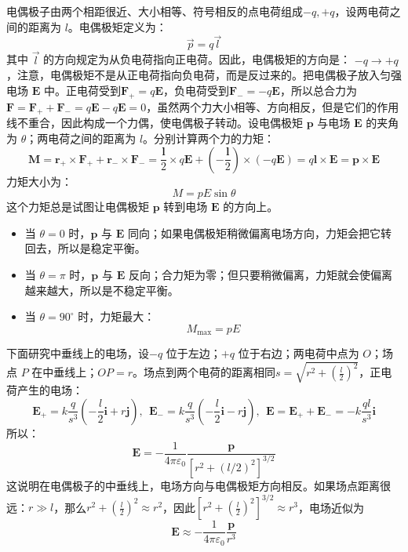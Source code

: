 \documentclass[lang=cn,11pt]{elegantbook}
\begin{document}
\begin{definition}[电偶极子]
  电偶极子由两个相距很近、大小相等、符号相反的点电荷组成\(-q,+q\)，设两电荷之间的距离为 \(l\)。电偶极矩定义为：
\[
\vec{p}=q\overrightarrow{l}
\]其中 \(\overrightarrow{l}\) 的方向规定为从负电荷指向正电荷。因此，电偶极矩的方向是：
\(
-q\longrightarrow +q
\)，注意，电偶极矩不是从正电荷指向负电荷，而是反过来的。把电偶极子放入匀强电场 \(\mathbf E\) 中。正电荷受到\(\mathbf F_+=q\mathbf E\)，负电荷受到\(\mathbf F_-=-q\mathbf E\)，所以总合力为\(\mathbf F=\mathbf F_++\mathbf F_-=q\mathbf E-q\mathbf E=0\)，虽然两个力大小相等、方向相反，但是它们的作用线不重合，因此构成一个力偶，使电偶极子转动。设电偶极矩 \(\mathbf p\) 与电场 \(\mathbf E\) 的夹角为 \(\theta\)；两电荷之间的距离为 \(l\)。分别计算两个力的力矩：
\[\mathbf M=\mathbf r_+\times\mathbf F_++\mathbf r_-\times\mathbf F_-=\frac{\mathbf l}{2}\times q\mathbf E+\left(-\frac{\mathbf l}{2}\right)\times(-q\mathbf E)=q\mathbf l\times\mathbf E=\mathbf p\times\mathbf E
\]力矩大小为：
\[
\boxed{M=pE\sin\theta}
\]这个力矩总是试图让电偶极矩 \(\mathbf p\) 转到电场 \(\mathbf E\) 的方向上。
\begin{itemize}
\item 当 \(\theta=0\) 时，\(\mathbf p\) 与 \(\mathbf E\) 同向；如果电偶极矩稍微偏离电场方向，力矩会把它转回去，所以是稳定平衡。
\item 当 \(\theta=\pi\) 时，\(\mathbf p\) 与 \(\mathbf E\) 反向；合力矩为零；但只要稍微偏离，力矩就会使偏离越来越大，所以是不稳定平衡。
\item 当 \(\theta=90^\circ\) 时，力矩最大：
\[
M_{\max}=pE
\]
\end{itemize}
下面研究中垂线上的电场，设\(-q\) 位于左边；\(+q\) 位于右边；两电荷中点为 \(O\)；场点 \(P\) 在中垂线上；\(OP=r\)。场点到两个电荷的距离相同\(s=\sqrt{r^2+\left(\frac l2\right)^2}\)，正电荷产生的电场：
\[
\mathbf E_+=k\frac{q}{s^3}\left(-\frac l2\mathbf i+r\mathbf j\right),~~
\mathbf E_-=k\frac{q}{s^3}\left(-\frac l2\mathbf i-r\mathbf j\right),~~\mathbf E
=\mathbf E_++\mathbf E_-=-k\frac{ql}{s^3}\mathbf i
\]
所以：
\[
\boxed{
\mathbf E
=
-\frac{1}{4\pi\varepsilon_0}
\frac{\mathbf p}
{\left[r^2+(l/2)^2\right]^{3/2}}
}
\]这说明在电偶极子的中垂线上，电场方向与电偶极矩方向相反。如果场点距离很远：\(r\gg l\)，那么\(r^2+\left(\frac l2\right)^2\approx r^2\)，因此\(\left[r^2+\left(\frac l2\right)^2\right]^{3/2}\approx r^3\)，电场近似为\[\boxed{\mathbf E\approx-\frac{1}{4\pi\varepsilon_0}\frac{\mathbf p}{r^3}}\]
\end{definition}
\end{document}
